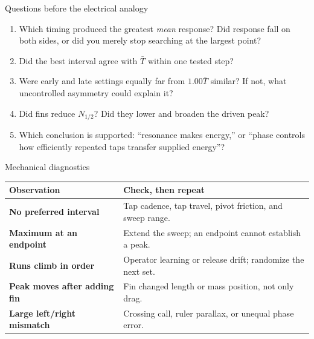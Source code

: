 \begin{teloscard}{Questions before the electrical analogy}
\begin{enumerate}
\item Which timing produced the greatest \emph{mean} response? Did response
fall on both sides, or did you merely stop searching at the largest point?
\item Did the best interval agree with \(\bar T\) within one tested step?
\item Were early and late settings equally far from \(1.00\bar T\) similar?
If not, what uncontrolled asymmetry could explain it?
\item Did fins reduce \(N_{1/2}\)? Did they lower and broaden the driven peak?
\item Which conclusion is supported: ``resonance makes energy,'' or
``phase controls how efficiently repeated taps transfer supplied energy''?
\end{enumerate}
\end{teloscard}

\begin{teloscard}{Mechanical diagnostics}
\begin{tabularx}{\linewidth}{@{}>{\bfseries}p{.25\linewidth}L@{}}
\toprule
Observation & Check, then repeat\\
\midrule
No preferred interval & Tap cadence, tap travel, pivot friction, and sweep range.\\
Maximum at an endpoint & Extend the sweep; an endpoint cannot establish a peak.\\
Runs climb in order & Operator learning or release drift; randomize the next set.\\
Peak moves after adding fin & Fin changed length or mass position, not only drag.\\
Large left/right mismatch & Crossing call, ruler parallax, or unequal phase error.\\
\bottomrule
\end{tabularx}
\end{teloscard}


